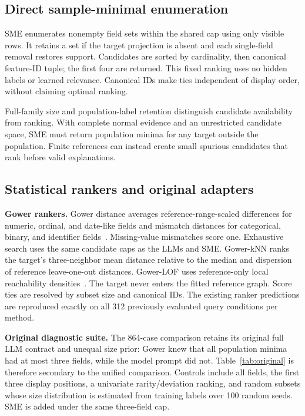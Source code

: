 \documentclass[conference]{IEEEtran}
\begin{document}
\subsection{Direct sample-minimal enumeration}
SME enumerates nonempty field sets within the shared cap using only visible rows. It retains a set if the target projection is absent and each single-field removal restores support. Candidates are sorted by cardinality, then canonical feature-ID tuple; the first four are returned. This fixed ranking uses no hidden labels or learned relevance. Canonical IDs make ties independent of display order, without claiming optimal ranking.

Full-family size and population-label retention distinguish candidate availability from ranking. With complete normal evidence and an unrestricted candidate space, SME must return population minima for any target outside the population. Finite references can instead create small spurious candidates that rank before valid explanations.

\subsection{Statistical rankers and original adapters}
\textbf{Gower rankers.} Gower distance averages reference-range-scaled differences for numeric, ordinal, and date-like fields and mismatch distances for categorical, binary, and identifier fields~\cite{gower1971similarity}. Missing-value mismatches score one. Exhaustive search uses the same candidate caps as the LLMs and SME. Gower-kNN ranks the target's three-neighbor mean distance relative to the median and dispersion of reference leave-one-out distances. Gower-LOF uses reference-only local reachability densities~\cite{breunig2000lof}. The target never enters the fitted reference graph. Score ties are resolved by subset size and canonical IDs. The existing ranker predictions are reproduced exactly on all 312 previously evaluated query conditions per method.

\textbf{Original diagnostic suite.} The 864-case comparison retains its original full LLM contract and unequal size prior: Gower knew that all population minima had at most three fields, while the model prompt did not. Table~\ref{tab:original} is therefore secondary to the unified comparison. Controls include all fields, the first three display positions, a univariate rarity/deviation ranking, and random subsets whose size distribution is estimated from training labels over 100 random seeds. SME is added under the same three-field cap.
\end{document}
